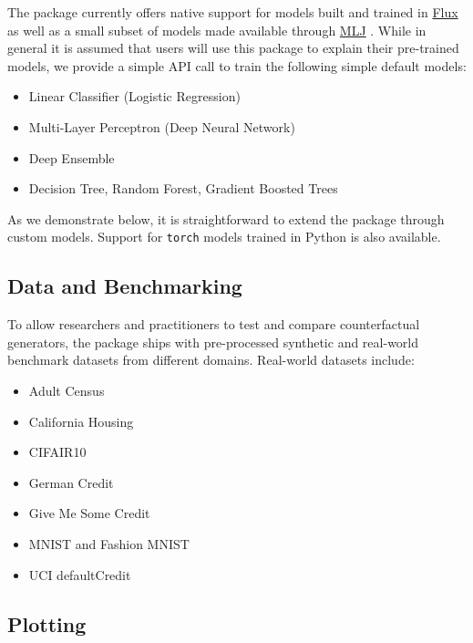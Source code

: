 \documentclass[
  letterpaper,
  DIV=11,
  numbers=noendperiod]{scrartcl}
\begin{document}
The package currently offers native support for models built and trained
in \href{https://fluxml.ai/}{Flux} as well as a small subset of models
made available through
\href{https://alan-turing-institute.github.io/MLJ.jl/dev/}{MLJ}
\cite{blaom2020mlj}. While in general it is assumed that users will use
this package to explain their pre-trained models, we provide a simple
API call to train the following simple default models:

\begin{itemize}
\item Linear Classifier (Logistic Regression)
\item Multi-Layer Perceptron (Deep Neural Network)
\item Deep Ensemble \cite{lakshminarayanan2016simple}
\item Decision Tree, Random Forest, Gradient Boosted Trees
\end{itemize}

As we demonstrate below, it is straightforward to extend the package
through custom models. Support for \texttt{torch} models trained in
Python is also available.

\hypertarget{data-and-benchmarking}{%
\subsection{Data and Benchmarking}\label{data-and-benchmarking}}

To allow researchers and practitioners to test and compare
counterfactual generators, the package ships with pre-processed
synthetic and real-world benchmark datasets from different domains.
Real-world datasets include:

\begin{itemize}
\item Adult Census \cite{becker1996adult}
\item California Housing \cite{pace1997sparse}
\item CIFAIR10 \cite{krizhevsky2009learning}
\item German Credit \cite{hoffman1994german}
\item Give Me Some Credit \cite{kaggle2011give}
\item MNIST \cite{lecun1998mnist} and Fashion MNIST \cite{xiao2017fashion}
\item UCI defaultCredit \cite{yeh2009comparisons}
\end{itemize}

\hypertarget{plotting}{%
\subsection{Plotting}\label{plotting}}
\end{document}
